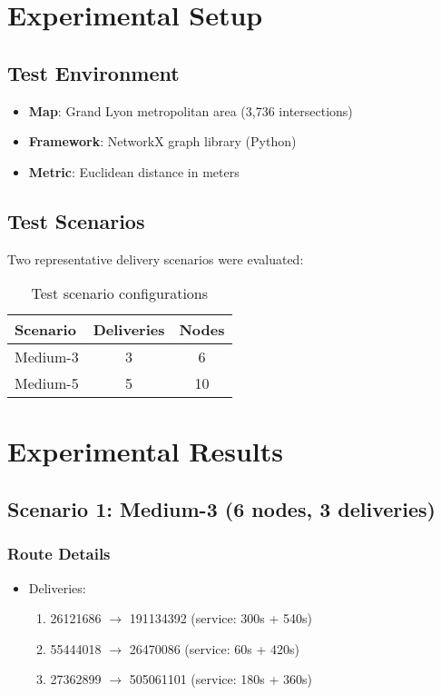 \documentclass[9pt,a4paper,twoside]{tau}
\begin{document}
\section{Experimental Setup}

\subsection{Test Environment}
\begin{itemize}
    \item \textbf{Map}: Grand Lyon metropolitan area (3,736 intersections)
    \item \textbf{Framework}: NetworkX graph library (Python)
    \item \textbf{Metric}: Euclidean distance in meters
\end{itemize}

\subsection{Test Scenarios}

Two representative delivery scenarios were evaluated:

\begin{table}[h]
\centering
\begin{tabular}{@{}lcc@{}}
\toprule
\textbf{Scenario} & \textbf{Deliveries} & \textbf{Nodes} \\
\midrule
Medium-3 & 3 & 6 \\
Medium-5 & 5 & 10 \\
\bottomrule
\end{tabular}
\caption{Test scenario configurations}
\label{tab:scenarios}
\end{table}


\section{Experimental Results}

\subsection{Scenario 1: Medium-3 (6 nodes, 3 deliveries)}

\subsubsection{Route Details}
\begin{itemize}
    \item Deliveries:
    \begin{enumerate}
        \item 26121686 $\to$ 191134392 (service: 300s + 540s)
        \item 55444018 $\to$ 26470086 (service: 60s + 420s)
        \item 27362899 $\to$ 505061101 (service: 180s + 360s)
    \end{enumerate}
\end{itemize}
\end{document}
